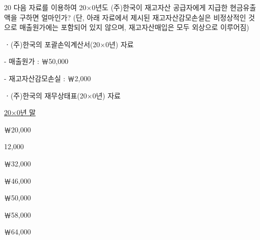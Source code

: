 \begin{question}{20}
다음 자료를 이용하여 20×0년도 (주)한국이 재고자산 공급자에게 지급한 현금유출액을 구하면 얼마인가? (단, 아래 자료에서 제시된 재고자산감모손실은 비정상적인 것으로 매출원가에는 포함되어 있지 않으며, 재고자산매입은 모두 외상으로 이루어짐)
\begin{framedtext}
ㆍ(주)한국의 포괄손익계산서(20×0년) 자료 \par
\hspace*{1em}- 매출원가 : ￦50,000 \par
\hspace*{1em}- 재고자산감모손실 : ￦2,000 \par
\medskip
ㆍ(주)한국의 재무상태표(20×0년) 자료 \par
\hspace*{1em}\makebox[3.2cm][l]{\ }\uline{20×0년 말} \par
\hspace*{1em}￦20,000 \par
\hspace*{1em}\hspace*{0.6em}12,000
\end{framedtext}
\begin{choices}
  \item ￦32,000
  \item ￦46,000
  \item ￦50,000
  \item ￦58,000
  \item ￦64,000
\end{choices}
\end{question}
